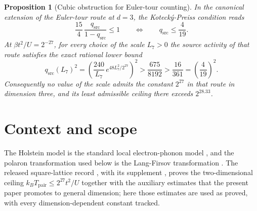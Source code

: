 \documentclass[11pt]{article}
\theoremstyle{plain}
\newtheorem{proposition}{Proposition}
\theoremstyle{definition}
\begin{document}
\begin{proposition}[Cubic obstruction for Euler-tour counting]\label{prop:c}
In the canonical extension of the Euler-tour route at $d=3$, the Koteck\'y-Preiss
condition reads
\begin{equation}\label{eq:c19}
 \frac{15}{4}\,\frac{q_{\mathrm{src}}}{1-q_{\mathrm{src}}}\le1
 \qquad\Longleftrightarrow\qquad
 q_{\mathrm{src}}\le\frac{4}{19}.
\end{equation}
At $\beta t^2/U=2^{-27}$, for every choice of the scale $L_7>0$ the source activity
of that route satisfies the exact rational lower bound
\begin{equation}\label{eq:c675}
 q_{\mathrm{src}}(L_7)^2=\left(\frac{240}{L_7}\,
 e^{48L_7^2/2^{27}}\right)^2>\frac{675}{8192}
 >\frac{16}{361}=\left(\frac{4}{19}\right)^2 .
\end{equation}
Consequently no value of the scale admits the constant $2^{27}$ in that route in
dimension three, and its least admissible ceiling there exceeds $2^{28.33}$.
\end{proposition}

\section{Context and scope}\label{sec:context}

The Holstein model is the standard local electron-phonon model \cite{holstein}, and
the polaron transformation used below is the Lang-Firsov transformation
\cite{langfirsov}. The released square-lattice record \cite{rens2d}, with its
supplement \cite{rens2dsupp}, proves the two-dimensional ceiling
$k_BT_{\mathrm{pair}}\le2^{27}t^2/U$ together with the auxiliary estimates that the
present paper promotes to general dimension; here those estimates are used as
proved, with every dimension-dependent constant tracked.
\end{document}
